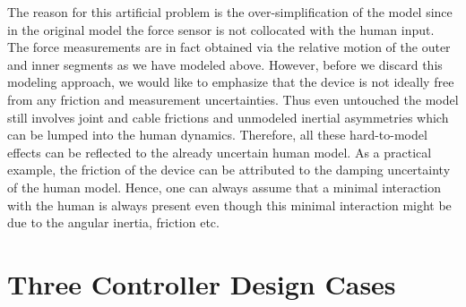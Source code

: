 The reason for this artificial problem is the over-simplification of the model since in the original model 
the force sensor is not collocated with the human input. The force measurements are in fact obtained 
via the relative motion of the outer and inner segments as we have modeled above. However, before we discard 
this modeling approach, we would like to emphasize that the device is not ideally free from any friction and 
measurement uncertainties. Thus even untouched the model still involves joint and cable frictions and unmodeled
inertial asymmetries which can be lumped into the human dynamics. Therefore, all these hard-to-model effects 
can be reflected to the already uncertain human model. As a practical example, the friction of the device can 
be attributed to the damping uncertainty of the human model. Hence, one can always assume that a minimal 
interaction with the human is always present even though this minimal interaction might be due to the angular 
inertia, friction etc. 
%

\section{Three Controller Design Cases}


